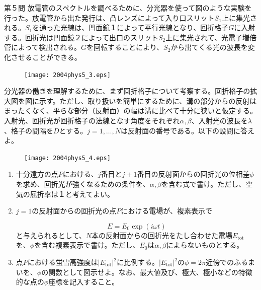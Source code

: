 \documentclass[fleqn]{jbook}
\begin{document}
\begin{question}{第５問}{}
放電管のスペクトルを調べるために、分光器を使って図のような実験を行った。放電管から出た発行は、凸レンズによって入り口スリット$S_1$上に集光される。$S_1$を通った光線は、凹面鏡１によって平行光線となり、回折格子$G$に入射する。回折光は凹面鏡２によって出口のスリット$S_2$上に集光されて、光電子増倍管によって検出される。$G$を回転することにより、$S_2$から出てくる光の波長を変化させることができる。

\begin{figure}[htbp]
\begin{center}
\texttt{[image: 2004phys5\_3.eps]}
\caption{}
\end{center}
\end{figure}

分光器の働きを理解するために、まず回折格子について考察する。回折格子の拡大図を図に示す。ただし、取り扱いを簡単にするために、溝の部分からの反射はまったくなく、平らな部分（反射面）の幅は溝に比べて十分に狭いと仮定する。入射光、回折光が回折格子の法線となす角度をそれぞれ$\alpha,\beta$、入射光の波長を$\lambda$、格子の間隔を$D$とする。$j=1,\ldots,N$は反射面の番号である。以下の設問に答えよ。

\begin{figure}[htbp]
\begin{center}
\texttt{[image: 2004phys5\_4.eps]}
\caption{}
\end{center}
\end{figure}

\begin{enumerate}

\item 十分遠方の点$P$における、$j$番目と$j+1$番目の反射面からの回折光の位相差$\phi$を求め、回折光が強くなるための条件を、$\alpha,\beta$を含む式で書け。ただし、空気の屈折率は１と考えてよい。

\item
$j=1$の反射面からの回折光の点$P$における電場が、複素表示で

$$
E=E_0 \exp(i\omega t)
$$
と与えられるとして、$N$本の反射面からの回折光をたし合わせた電場$E_{\text{tot}}$を、$\phi$を含む複素表示で書け。ただし、$E_0$は$\alpha,\beta$によらないものとする。

\item
点$P$における蛍雪高強度は$|E_{\text{tot}}|^2$に比例する。$|E_{\text{tot}}|^2$の$\phi=2\pi$近傍でのふるまいを、$\phi$の関数として図示せよ。なお、最大値及び、極大、極小などの特徴的な点の$\phi$座標を記入すること。


\end{enumerate}
\end{question}
\end{document}
